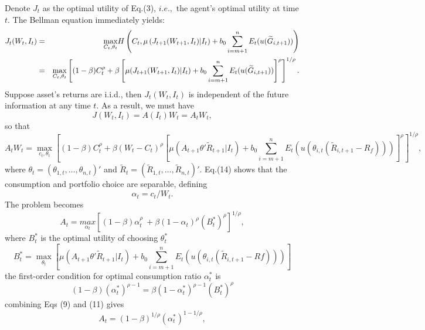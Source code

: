 \documentclass[ukenglish,nottitlepage,thmsb,11pt,letterpaper]{article}
\begin{document}
Denote $J_t$ as the optimal utility of Eq.(3), $i.e.,$ the agent's optimal utility at time $t$. The Bellman equation immediately yields:
\begin{eqnarray*}
J_t (W_t, I_t) &=& \underset{C_t, \theta_t}{\max} H\left( C_t, \mu \left(J_{t+1} (W_{t+1}, I_t) \vert I_t \right) +  b_0 \sum_{i = m+1}^{n}E_t ( u(\widetilde{G}_{i,t+1}) ) \right)
\cr
&=& \underset{C_t, \theta_t}{\max} \left[ (1-\beta) C_t^ \rho + \beta \left[ \mu  (J_{t+1} (W_{t+1}, I_t) \vert I_t ) +  b_0 \sum_{i = m+1}^{n}E_t ( u(\widetilde{G}_{i,t+1}) ) \right]^ \rho\right]^{1/\rho}.
\end{eqnarray*}
Suppose asset's returns are i.i.d., then $J_t (W_t, I_t)$ is independent of the future information at any time $t$. As a result, we must have
\begin{equation}
J(W_t,I_t) = A(I_t)W_t = A_t W_t,
\end{equation}
so that
\begin{equation}
A_t W_t =  \underset{c_t, \theta_t}{\max} \left[ (1-\beta) C_t^ \rho + \beta (W_t-C_t)^{\rho} \left[ \mu (A_{t+1} \theta' \widetilde{R}_{t+1} \vert I_t ) +  b_0 \sum_{i = m+1}^{n}E_t ( u(\theta_{i,t} (\widetilde{R}_{i,t+1} - R_f)) ) \right]^ \rho\right]^{1/\rho},
\end{equation}
where $\theta_t = (\theta_{1,t}, \dots, \theta_{n,t})'$ and $\widetilde{R}_t = (\widetilde{R}_{1,t}, \dots, \widetilde{R}_{n,t})'$.
Eq.(14) shows that the consumption and portfolio choice are separable, defining
\begin{equation*}
\alpha_t = c_t / W_t.
\end{equation*}
The problem becomes
\begin{equation}
A_t = \underset{\alpha_t}{max} \left[ (1-\beta) \alpha_t ^{\rho}\ + \beta (1-\alpha_t)^\rho (B^*_{t})^\rho \right]^{1/\rho},
\end{equation}
where $B^*_{t}$ is the optimal utility of choosing $\theta_t ^*$
\begin{equation}
B^*_{t} = \underset {\theta_t}{\max} \left[ \mu (A_{t+1} \theta' \widetilde{R}_{t+1} \vert I_t ) +  b_0 \sum_{i = m+1}^{n}E_t ( u(\theta_{i,t} (\widetilde{R}_{i,t+1} - Rf) )) \right]
\end{equation}
the first-order condition for optimal consumption ratio $\alpha_t^*$ is
\begin{equation}
(1-\beta)(\alpha_{t} ^ {*})^{\rho-1} = \beta(1-\alpha_{t} ^ {*})^{\rho-1}(B^*_{t})^\rho
\end{equation}
combining Eqs (9) and (11) gives
\begin{equation}
A_t = (1-\beta)^{1/\rho}(\alpha_t^*)^{1-1/ \rho},
\end{equation}
\end{document}
